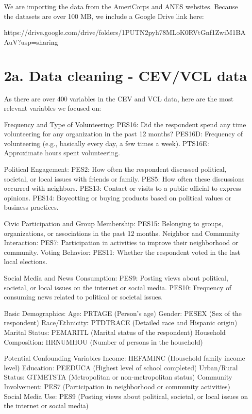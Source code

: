 \documentclass[
  letterpaper,
  DIV=11,
  numbers=noendperiod]{scrartcl}
\begin{document}
We are importing the data from the AmeriCorps and ANES websites. Because
the datasets are over 100 MB, we include a Google Drive link here:

https://drive.google.com/drive/folders/1PUTN2pyh78MLoK0RVtGnf1ZwiM1BAAuV?usp=sharing

\section{2a. Data cleaning - CEV/VCL
data}\label{a.-data-cleaning---cevvcl-data}

As there are over 400 variables in the CEV and VCL data, here are the
most relevant variables we focused on:

Frequency and Type of Volunteering: PES16: Did the respondent spend any
time volunteering for any organization in the past 12 months? PES16D:
Frequency of volunteering (e.g., basically every day, a few times a
week). PTS16E: Approximate hours spent volunteering.

Political Engagement: PES2: How often the respondent discussed
political, societal, or local issues with friends or family. PES5: How
often these discussions occurred with neighbors. PES13: Contact or
visits to a public official to express opinions. PES14: Boycotting or
buying products based on political values or business practices.

Civic Participation and Group Membership: PES15: Belonging to groups,
organizations, or associations in the past 12 months. Neighbor and
Community Interaction: PES7: Participation in activities to improve
their neighborhood or community. Voting Behavior: PES11: Whether the
respondent voted in the last local elections.

Social Media and News Consumption: PES9: Posting views about political,
societal, or local issues on the internet or social media. PES10:
Frequency of consuming news related to political or societal issues.

Basic Demographics: Age: PRTAGE (Person's age) Gender: PESEX (Sex of the
respondent) Race/Ethnicity: PTDTRACE (Detailed race and Hispanic origin)
Marital Status: PEMARITL (Marital status of the respondent) Household
Composition: HRNUMHOU (Number of persons in the household)

Potential Confounding Variables Income: HEFAMINC (Household family
income level) Education: PEEDUCA (Highest level of school completed)
Urban/Rural Status: GTMETSTA (Metropolitan or non-metropolitan status)
Community Involvement: PES7 (Participation in neighborhood or community
activities) Social Media Use: PES9 (Posting views about political,
societal, or local issues on the internet or social media)
\end{document}

